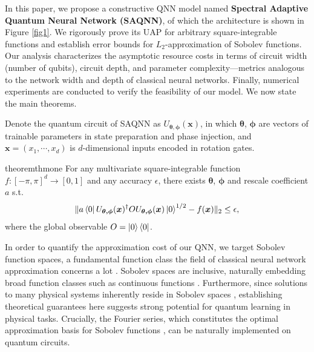 \documentclass{article}
\theoremstyle{plain}
\theoremstyle{definition}
\theoremstyle{remark}
\begin{document}
In this paper, we propose a constructive QNN model named \textbf{Spectral Adaptive Quantum Neural Network (SAQNN)}, of which the architecture is shown in Figure \ref{fig1}. We rigorously prove its UAP for arbitrary square-integrable functions and establish error bounds for $L_2$-approximation of Sobolev functions. Our analysis characterizes the asymptotic resource costs in terms of circuit width (number of qubits), circuit depth, and parameter complexity—metrics analogous to the network width and depth of classical neural networks. Finally, numerical experiments are conducted to verify the feasibility of our model. We now state the main theorems.

Denote the quantum circuit of SAQNN as $U_{\boldsymbol{\theta,\phi}}(\boldsymbol{x})$, in which $\boldsymbol{\theta}$, $\boldsymbol{\phi}$ are vectors of trainable parameters in state preparation and phase injection, and $\boldsymbol{x}=(x_1,\cdots,x_{d})$ is $d$-dimensional inputs encoded in rotation gates. 

\begin{restatable}{theorem}{thmone}\label{thm1}
    For any multivariate square-integrable function $f: [-\pi,\pi]^d\rightarrow [0,1]$ and any accuracy $\epsilon$, there exists $\boldsymbol{\theta}$, $\boldsymbol{\phi}$ and rescale coefficient $a$ s.t. 
    \begin{equation*}
        \Vert a\bra{0}U_{\boldsymbol{\theta,\phi}}(\boldsymbol{x})^\dagger O U_{\boldsymbol{\theta,\phi}}(\boldsymbol{x})\ket{0}^{1/2} 
        -
        f(\boldsymbol{x})
        \Vert_{2}
        \leq
        \epsilon,
    \end{equation*}
    where the global observable $O=\ket{0}\bra{0}$.
\end{restatable}

In order to quantify the approximation cost of our QNN, we target Sobolev function spaces, a fundamental function class the field of classical neural network approximation concerns a lot \cite{yarotsky2017,lu2021}. Sobolev spaces are inclusive, naturally embedding broad function classes such as continuous functions \cite{adams2003}. Furthermore, since solutions to many physical systems inherently reside in Sobolev spaces \cite{evans2022}, establishing theoretical guarantees here suggests strong potential for quantum learning in physical tasks. Crucially, the Fourier series, which constitutes the optimal approximation basis for Sobolev functions \cite{pinkus2012}, can be naturally implemented on quantum circuits. 
\end{document}
